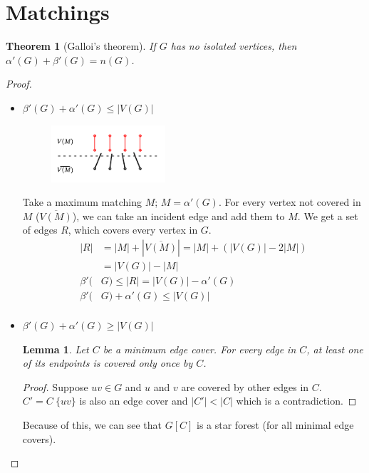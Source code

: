 \documentclass[notitlepage, 12pt]{article}
\newtheorem*{theorem}{Theorem}
\newtheorem*{lemma}{Lemma}
\begin{document}
\section{Matchings}
\begin{theorem}[Galloi's theorem]\MakeLinkTarget{}\label{gallois-theorem}
  If $G$ has no isolated vertices, then $\alpha'(G) + \beta'(G) = n(G)$.
\end{theorem}
\begin{proof}
\begin{itemize}
    \item[(1)] $\beta'(G) + \alpha'(G) \leq |V(G)|$ \\ \newline
    \begin{figure}[h]
      \includegraphics[width=0.4\textwidth]{gallois-theorem-1.pdf}
      \centering
    \end{figure}
    Take a maximum matching $M$; $M = \alpha'(G)$. For every vertex not covered
    in $M$ ($\overline{V(M)}$), we can take an incident edge and add them to $M$.
    We get a set of edges $R$, which covers every vertex in $G$.
    \begin{align*}
      |R| &= |M| + |\overline{V(M)}| = |M| + (|V(G)| - 2|M|)\\
      &= |V(G)| - |M|\\
      \beta'(&G) \leq |R| = |V(G)| - \alpha'(G)\\
      \beta'(&G) + \alpha'(G) \leq |V(G)|\\
    \end{align*}
  \item[(2)] $\beta'(G) + \alpha'(G) \geq |V(G)|$ \\ \newline
  \begin{lemma}
    Let $C$ be a minimum edge cover. For every edge in $C$, at least one of its
    endpoints is covered only once by $C$.
  \end{lemma}
  \begin{proof}
    Suppose $uv \in G$ and $u$ and $v$ are covered by other edges in $C$.
    $C' = C\ \{uv\}$ is also an edge cover and $|C'| < |C|$ which is a contradiction.
  \end{proof}
  Because of this, we can see that $G[C]$ is a star forest (for all minimal edge covers).

\end{itemize}
\end{proof}
\end{document}
